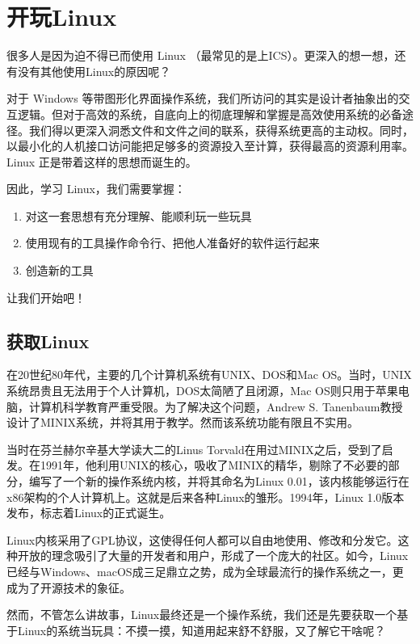 \documentclass[../main.tex]{subfiles}
\begin{document}
\chapter{开玩Linux}\label{chap:play-with-linux}

很多人是因为迫不得已而使用 Linux \faLinux（最常见的是上ICS）。更深入的想一想，还有没有其他使用Linux的原因呢？

对于 Windows 等带图形化界面操作系统，我们所访问的其实是设计者抽象出的交互逻辑。但对于高效的系统，自底向上的彻底理解和掌握是高效使用系统的必备途径。我们得以更深入洞悉文件和文件之间的联系，获得系统更高的主动权。同时，以最小化的人机接口访问能把足够多的资源投入至计算，获得最高的资源利用率。Linux 正是带着这样的思想而诞生的。

因此，学习 Linux，我们需要掌握：

\begin{enumerate}
  \item 对这一套思想有充分理解、能顺利玩一些玩具
  \item 使用现有的工具操作命令行、把他人准备好的软件运行起来
  \item 创造新的工具
\end{enumerate}

让我们开始吧！

\section{获取Linux}

在20世纪80年代，主要的几个计算机系统有UNIX、DOS和Mac OS。当时，UNIX系统昂贵且无法用于个人计算机，DOS太简陋了且闭源，Mac OS则只用于苹果电脑，计算机科学教育严重受限。为了解决这个问题，Andrew S. Tanenbaum教授设计了MINIX系统，并将其用于教学。然而该系统功能有限且不实用。

当时在芬兰赫尔辛基大学读大二的Linus Torvald在用过MINIX之后，受到了启发。在1991年，他利用UNIX的核心，吸收了MINIX的精华，剔除了不必要的部分，编写了一个新的操作系统内核，并将其命名为Linux 0.01，该内核能够运行在x86架构的个人计算机上。这就是后来各种Linux的雏形。1994年，Linux 1.0版本发布，标志着Linux的正式诞生。

Linux内核采用了GPL协议，这使得任何人都可以自由地使用、修改和分发它。这种开放的理念吸引了大量的开发者和用户，形成了一个庞大的社区。如今，Linux已经与Windows、macOS成三足鼎立之势，成为全球最流行的操作系统之一，更成为了开源技术的象征。

然而，不管怎么讲故事，Linux最终还是一个操作系统，我们还是先要获取一个基于Linux的系统当玩具：不摸一摸，知道用起来舒不舒服，又了解它干啥呢？
\end{document}
